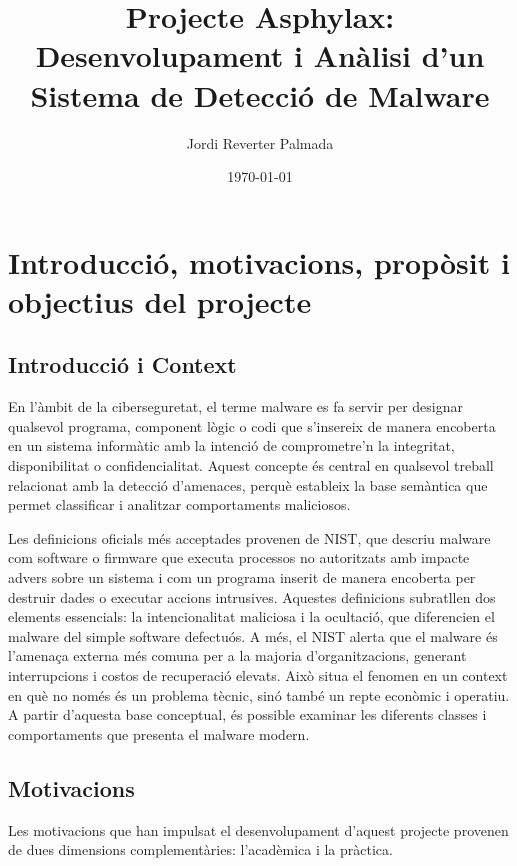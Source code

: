 \documentclass[12pt,a4paper]{report}
\title{Projecte Asphylax: Desenvolupament i Anàlisi d'un Sistema de Detecció de Malware}
\author{Jordi Reverter Palmada}
\date{\today}
\begin{document}
\maketitle

\tableofcontents
\listoftables
\listoffigures

\chapter{Introducció, motivacions, propòsit i objectius del projecte}
\label{ch:introduccio}

\section{Introducció i Context}
En l'àmbit de la ciberseguretat, el terme malware es fa servir per designar qualsevol programa, component lògic o codi que s'insereix de manera encoberta en un sistema informàtic amb la intenció de comprometre'n la integritat, disponibilitat o confidencialitat. Aquest concepte és central en qualsevol treball relacionat amb la detecció d'amenaces, perquè estableix la base semàntica que permet classificar i analitzar comportaments maliciosos.

Les definicions oficials més acceptades provenen de NIST, que descriu malware com software o firmware que executa processos no autoritzats amb impacte advers sobre un sistema i com un programa inserit de manera encoberta per destruir dades o executar accions intrusives. Aquestes definicions subratllen dos elements essencials: la intencionalitat maliciosa i la ocultació, que diferencien el malware del simple software defectuós. A més, el NIST alerta que el malware és l'amenaça externa més comuna per a la majoria d'organitzacions, generant interrupcions i costos de recuperació elevats. Això situa el fenomen en un context en què no només és un problema tècnic, sinó també un repte econòmic i operatiu. A partir d'aquesta base conceptual, és possible examinar les diferents classes i comportaments que presenta el malware modern.

\section{Motivacions}
Les motivacions que han impulsat el desenvolupament d'aquest projecte provenen de dues dimensions complementàries: l'acadèmica i la pràctica.
\end{document}
